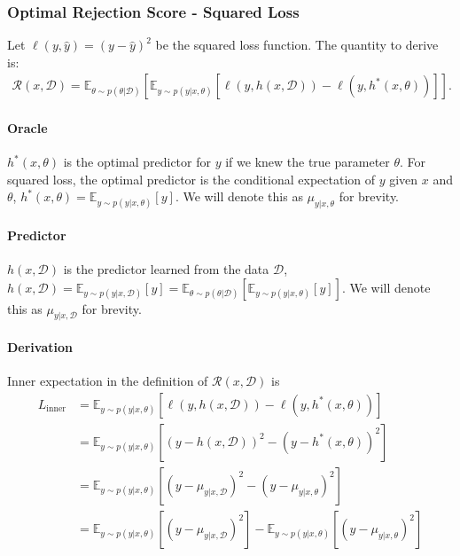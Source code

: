 \subsubsection{Optimal Rejection Score - Squared Loss}
Let $\ell(y, \hat{y}) = (y - \hat{y})^2$ be the squared loss function. The quantity to derive is:
\begin{align}
\mathcal{R}(x, \mathcal{D}) = \mathbb{E}_{\theta \sim p(\theta|\mathcal{D})} \left[ \mathbb{E}_{y \sim p(y|x, \theta)} \left[ \ell(y,h(x,\mathcal{D})) - \ell(y,h^*(x, \theta)) \right] \right].
\end{align}

\paragraph{Oracle}
$h^*(x, \theta)$ is the optimal predictor for $y$ if we knew the true parameter $\theta$. For squared loss, the optimal predictor is the conditional expectation of $y$ given $x$ and $\theta$, $h^*(x, \theta) = \mathbb{E}_{y \sim p(y|x, \theta)}[y]$. We will denote this as $\mu_{y|x,\theta}$ for brevity.

\paragraph{Predictor}
$h(x, \mathcal{D})$ is the predictor learned from the data $\mathcal{D}$, $h(x, \mathcal{D}) = \mathbb{E}_{y \sim p(y|x,\mathcal{D})}[y] = \mathbb{E}_{\theta\sim p(\theta|\mathcal{D})}\left[ \mathbb{E}_{y \sim p(y|x, \theta)}[y] \right]$. We will denote this as $\mu_{y|x,\mathcal{D}}$ for brevity.

\paragraph{Derivation}
Inner expectation in the definition of $\mathcal{R}(x, \mathcal{D})$ is
\begin{align}
L_{\text{inner}}&= \mathbb{E}_{y \sim p(y|x, \theta)} \left[ \ell(y,h(x,\mathcal{D})) - \ell(y,h^*(x, \theta)) \right] \nonumber \\
&= \mathbb{E}_{y \sim p(y|x, \theta)} \left[ (y - h(x,\mathcal{D}))^2 - (y - h^*(x, \theta))^2 \right] \nonumber \\
&= \mathbb{E}_{y \sim p(y|x, \theta)} \left[ (y - \mu_{y|x,\mathcal{D}})^2 - (y - \mu_{y|x,\theta})^2 \right] \nonumber \\
&= \mathbb{E}_{y \sim p(y|x, \theta)} \left[ (y - \mu_{y|x,\mathcal{D}})^2\right] - \mathbb{E}_{y \sim p(y|x, \theta)} \left[(y - \mu_{y|x,\theta})^2 \right]
\end{align}

